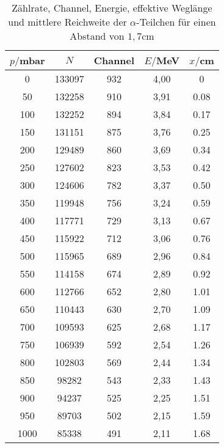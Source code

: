\begin{table}[H]
  \centering
  \caption{Zählrate, Channel, Energie, effektive Weglänge und mittlere Reichweite der $\alpha$-Teilchen für einen Abstand von $1,7$cm}
  \label{tab:Spannungsamplitude}
  \begin{tabular}{c c c c c}
    \toprule
    $p/$mbar & $N$ & Channel & $E/$MeV & $x/$cm   \\%
    \midrule
    0	  & 133097  & 932 &   4,00 & 0       \\ %
    50	& 132258  & 910 &   3,91 & 0.08     \\%
    100 & 132252  & 894 &   3,84 & 0.17    \\ %
    150 & 131151  & 875 &   3,76 & 0.25    \\ %
    200 & 129489  & 860 &   3,69 & 0.34    \\ %
    250 & 127602  & 823 &   3,53 & 0.42    \\ %
    300 & 124606  & 782 &   3,37 & 0.50    \\ %
    350 & 119948  & 756 &   3,24 & 0.59    \\ %
    400 & 117771  & 729 &   3,13 & 0.67    \\ %
    450 & 115922  & 712 &   3,06 & 0.76    \\ %
    500 & 115965  & 689 &   2,96 & 0.84    \\ %
    550 & 114158  & 674 &   2,89 & 0.92    \\ %
    600 & 112766  & 652 &   2,80 & 1.01    \\ %
    650 & 110443  & 630 &   2,70 & 1.09    \\ %
    700 & 109593  & 625 &   2,68 & 1.17    \\ %
    750 & 106939  & 592 &   2,54 & 1.26    \\ %
    800 & 102803  & 569 &   2,44 & 1.34    \\ %
    850 & 98282	  & 543 &   2,33 & 1.43    \\ %
    900 & 94237	  & 525 &   2,25 & 1.51    \\ %
    950 & 89703	  & 502 &   2,15 & 1.59    \\ %
    1000& 85338   & 491 &   2,11 & 1.68    \\ %
    \bottomrule
  \end{tabular}
\end{table}





